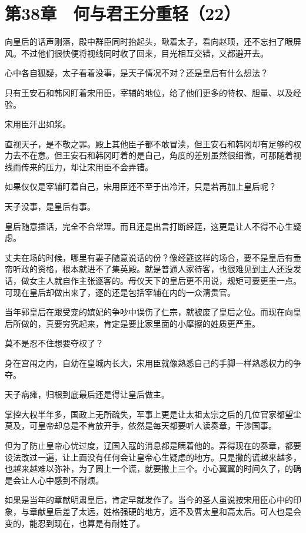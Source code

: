 \section{第38章　何与君王分重轻（22）}

向皇后的话声刚落，殿中群臣同时抬起头，瞅着太子，看向赵顼，还不忘扫了眼屏风。不过他们很快便将视线同时收了回来，目光相互交错，又都避开去。

心中各自狐疑，太子看着没事，是天子情况不对？还是皇后有什么想法？

只有王安石和韩冈盯着宋用臣，宰辅的地位，给了他们更多的特权、胆量、以及经验。

宋用臣汗出如浆。

直视天子，是不敬之罪。殿上其他臣子都不敢冒渎，但王安石和韩冈却有足够的权力去不在意。但王安石和韩冈盯着的是自己，角度的差别虽然很细微，可那随着视线而传来的压力，却让宋用臣不会弄错。

如果仅仅是宰辅盯着自己，宋用臣还不至于出冷汗，只是若再加上皇后呢？

天子没事，是皇后有事。

皇后随意插话，完全不合常理。而且还是出言打断经筵，这更是让人不得不心生疑虑。

丈夫在场的时候，哪里有妻子随意说话的份？像经筵这样的场合，要不是皇后有垂帘听政的资格，根本就进不了集英殿。就是普通人家待客，也很难见到主人还没发话，做女主人就自作主张逐客的。母仪天下的皇后更不用说，规矩可要更重一点。可现在皇后却做出来了，逐的还是包括宰辅在内的一众清贵官。

当年郭皇后在跟受宠的嫔妃的争吵中误伤了仁宗，就被废了皇后之位。而现在向皇后所做的，真要穷究起来，肯定是要比家里面的小摩擦的姓质更严重。

莫不是忍不住想要夺权了？

身在宫闱之内，自幼在皇城内长大，宋用臣就像熟悉自己的手脚一样熟悉权力的争夺。

天子病瘫，归根到底最后还是得让皇后做主。

掌控大权半年多，国政上无所疏失，军事上更是让太祖太宗之后的几位官家都望尘莫及，可皇帝却总是不肯放开手，依然是每天都要听人读奏章，干涉国事。

但为了防止皇帝心忧过度，辽国入寇的消息都是瞒着他的。弄得现在的奏章，都要设法改过一遍，让上面没有任何会让皇帝心生疑虑的地方。只是撒的谎越来越多，也越来越难以弥补，为了圆上一个谎，就要撒上三个。小心翼翼的时间久了，的确是会让人心中感到不耐烦。

如果是当年的章献明肃皇后，肯定早就发作了。当今的圣人虽说按宋用臣心中的印象，与章献皇后差了太远，姓格强硬的地方，远不及曹太皇和高太后。可人也是会变的，能忍到现在，也算是有耐姓了。

